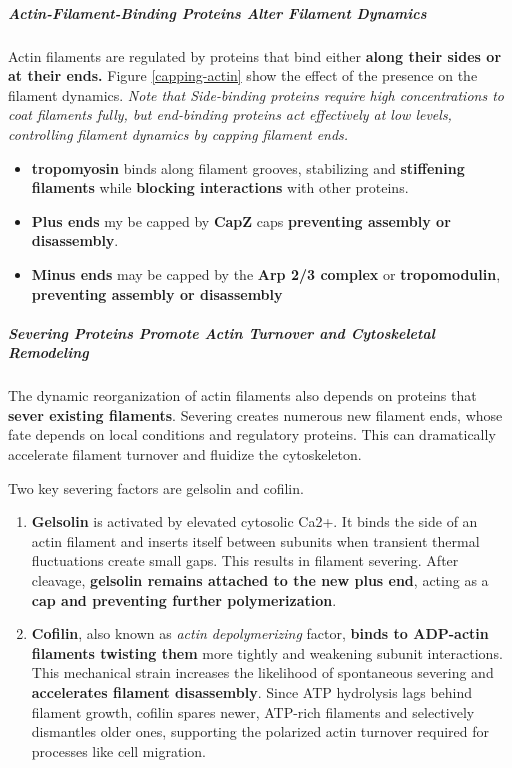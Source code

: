 \documentclass[../main.tex]{subfiles}
\begin{document}
\subparagraph{Actin-Filament-Binding Proteins Alter Filament Dynamics}
Actin filaments are regulated by proteins that bind either \textbf{along their sides or at their ends.}  Figure \ref{capping-actin} show the effect of the presence on the filament dynamics. \textit{Note that Side-binding proteins require high concentrations to coat filaments fully, but end-binding proteins act effectively at low levels, controlling filament dynamics by capping filament ends.} 
\begin{itemize}
	\item  \textbf{\gls{tropomyosin}} binds along filament grooves, stabilizing and \textbf{stiffening filaments} while \textbf{blocking interactions} with other proteins.
	
	\item \textbf{Plus ends} my be capped by \textbf{\gls{CapZ}} caps \textbf{preventing assembly or disassembly}. 
	
	\item \textbf{Minus ends} may be capped by the \textbf{Arp 2/3 complex} or \textbf{\gls{tropomodulin}}, \textbf{preventing assembly or disassembly} 
\end{itemize}


\subparagraph{Severing Proteins Promote Actin Turnover and Cytoskeletal Remodeling}
The dynamic reorganization of actin filaments also depends on proteins that \textbf{sever existing filaments}. Severing creates numerous new filament ends, whose fate depends on local conditions and regulatory proteins. This can dramatically accelerate filament turnover and fluidize the cytoskeleton.

Two key severing factors are \gls{gelsolin} and \gls{cofilin}. 
\begin{enumerate}
	\item \textbf{Gelsolin} is activated by elevated cytosolic Ca2+. It binds the side of an actin filament and inserts itself between subunits when transient thermal fluctuations create small gaps. This results in filament severing. After cleavage, \textbf{gelsolin remains attached to the new plus end}, acting as a \textbf{cap and preventing further polymerization}.
	
	\item \textbf{Cofilin}, also known as \textit{actin depolymerizing} factor, \textbf{binds to ADP-actin filaments twisting them} more tightly and weakening subunit interactions. This mechanical strain increases the likelihood of spontaneous severing and \textbf{accelerates filament disassembly}. Since ATP hydrolysis lags behind filament growth, cofilin spares newer, ATP-rich filaments and selectively dismantles older ones, supporting the polarized actin turnover required for processes like cell migration.
\end{enumerate}
\end{document}
